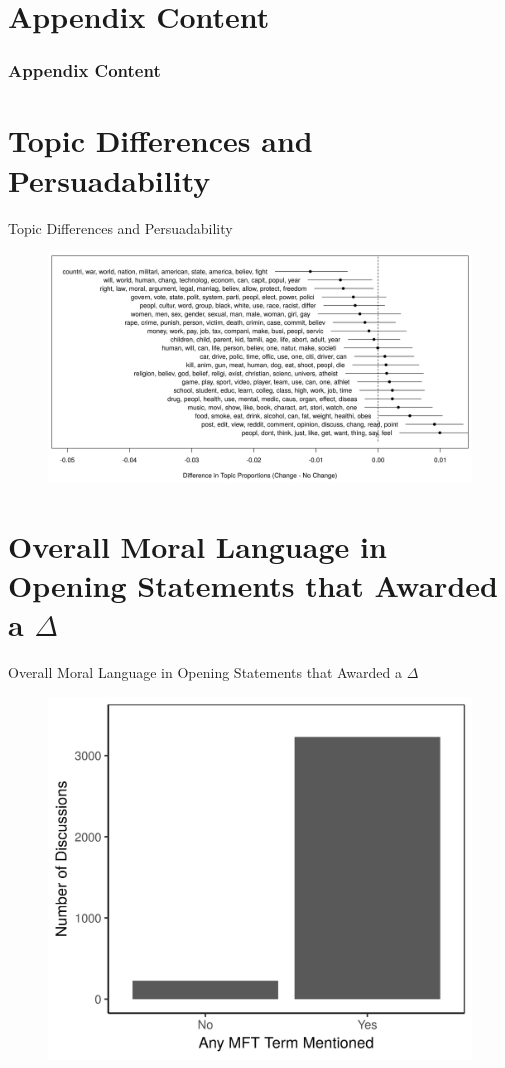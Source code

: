 \documentclass{beamer}
\begin{document}
\appendix
\section*{Appendix Content}
\label{sec:appendix-content}
\begin{frame}%
\frametitle{Appendix Content}
\small\tableofcontents %
\end{frame}

\section{Topic Differences and Persuadability}
\begin{frame}{Topic Differences and Persuadability}
\begin{figure}
	\includegraphics[width=\textwidth]{../calc/fig/stm_op_diff.png}
\end{figure}
\end{frame}

\section{Overall Moral Language in Opening Statements that Awarded a $\Delta$}
\begin{frame}{Overall Moral Language in Opening Statements that Awarded a $\Delta$}
\begin{figure}
	\includegraphics{../calc/fig/mft_op_all.png}
\end{figure}
\end{frame}
\end{document}
